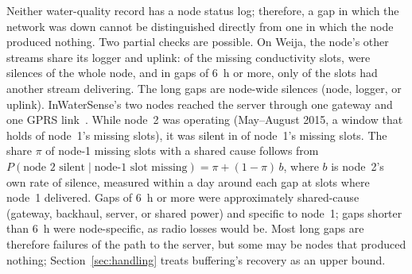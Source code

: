 Neither water-quality record has a node status log; therefore, a gap in which the network was down cannot be distinguished directly from one in which the node produced nothing. Two partial checks are possible. On Weija, the node's other streams share its logger and uplink: of the \weijaEcMissing{} missing conductivity slots, \weijaNodeSilentShare{} were silences of the whole node, and in gaps of 6~h or more, only \weijaLongAliveShare{} of the slots had another stream delivering. The long gaps are node-wide silences (node, logger, or uplink). InWaterSense's two nodes reached the server through one gateway and one GPRS link~\cite{ahmedi2022dataset}. While node~2 was operating (May--August 2015, a window that holds \inwsWindowShare{} of node~1's missing slots), it was silent in \inwsNodeTwoSilent{} of node~1's missing slots. The share $\pi$ of node-1 missing slots with a shared cause follows from $P(\text{node 2 silent}\mid\text{node-1 slot missing})=\pi+(1-\pi)\,b$, where $b$ is node~2's own rate of silence, measured within a day around each gap at slots where node~1 delivered. Gaps of 6~h or more were approximately \inwsSharedLong{} shared-cause (gateway, backhaul, server, or shared power) and \inwsSpecificLong{} specific to node~1; gaps shorter than 6~h were \inwsSpecificShort{} node-specific, as radio losses would be. Most long gaps are therefore failures of the path to the server, but some may be nodes that produced nothing; Section~\ref{sec:handling} treats buffering's recovery as an upper bound.

